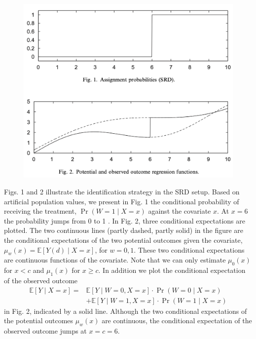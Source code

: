 \documentclass[11pt]{book}%
\begin{document}
\begin{figure}[H]
	\centering
	\includegraphics[scale=0.6]{fig1_2.png}
\end{figure}
Figs. 1 and 2  illustrate the identification strategy in the SRD setup. Based on artificial population values, we present in Fig. 1 the conditional probability of receiving the treatment, $\operatorname{Pr}(W=1 \mid X=x)$ against the covariate $x$. At $x=6$ the probability jumps from 0 to 1 . In Fig. 2, three conditional expectations are plotted. The two continuous lines (partly dashed, partly solid) in the figure are the conditional expectations of the two potential outcomes given the covariate, $\mu_{w}(x)=\mathbb{E}[Y(d) \mid X=x]$, for $w=0,1$. These two conditional expectations are continuous functions of the covariate. Note that we can only estimate $\mu_{0}(x)$ for $x<c$ and $\mu_{1}(x)$ for $x \geqslant c .$ In addition we plot the conditional expectation of the observed outcome
$$
\begin{aligned}
\mathbb{E}[Y \mid X=x]=& \mathbb{E}[Y \mid W=0, X=x] \cdot \operatorname{Pr}(W=0 \mid X=x) \\
&+\mathbb{E}[Y \mid W=1, X=x] \cdot \operatorname{Pr}(W=1 \mid X=x)
\end{aligned}
$$
in Fig. 2, indicated by a solid line. Although the two conditional expectations of the potential outcomes $\mu_{w}(x)$ are continuous, the conditional expectation of the observed outcome jumps at $x=c=6$.
\end{document}
